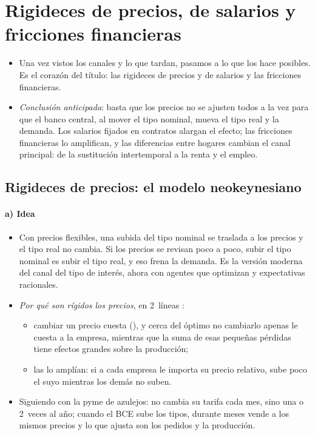 \documentclass[11pt]{article}
\begin{document}
\section{Rigideces de precios, de salarios\cortetitulo{} y fricciones financieras}\label{sec:rigideces}

\begin{itemize}
\item Una vez vistos los canales y lo que tardan, pasamos a lo que los hace posibles. Es el corazón del título: las rigideces de precios y de salarios y las fricciones financieras.
\item \emph{Conclusión anticipada}: basta que los precios no se ajusten todos a la vez para que el banco central, al mover el tipo nominal, mueva el tipo real y la demanda. Los salarios fijados en contratos alargan el efecto; las fricciones financieras lo amplifican, y las diferencias entre hogares cambian el canal principal: de la sustitución intertemporal a la renta y el empleo.
\end{itemize}

\subsection{Rigideces de precios: el modelo neokeynesiano}\label{sec:precios}

\paragraph{a) Idea}
\begin{itemize}
\item Con precios flexibles, una subida del tipo nominal se traslada a los precios y el tipo real no cambia. Si los precios se revisan poco a poco, subir el tipo nominal es subir el tipo real, y eso frena la demanda. Es la versión moderna del canal del tipo de interés, ahora con agentes que optimizan y expectativas racionales.
\item \emph{Por qué son rígidos los precios}, en 2~líneas :
  \begin{itemize}
  \item cambiar un precio cuesta (), y cerca del óptimo no cambiarlo apenas le cuesta a la empresa, mientras que la suma de esas pequeñas pérdidas tiene efectos grandes sobre la producción\nocite{Mankiw1985Small,AkerlofYellen1985NearRational};
  \item las  lo amplían: si a cada empresa le importa su precio relativo, sube poco el suyo mientras los demás no suben\nocite{BallRomer1990Real}.
  \end{itemize}
\item Siguiendo con la pyme de azulejos: no cambia su tarifa cada mes, sino una o 2~veces al año; cuando el BCE sube los tipos, durante meses vende a los mismos precios y lo que ajusta son los pedidos y la producción.
\end{itemize}
\end{document}
